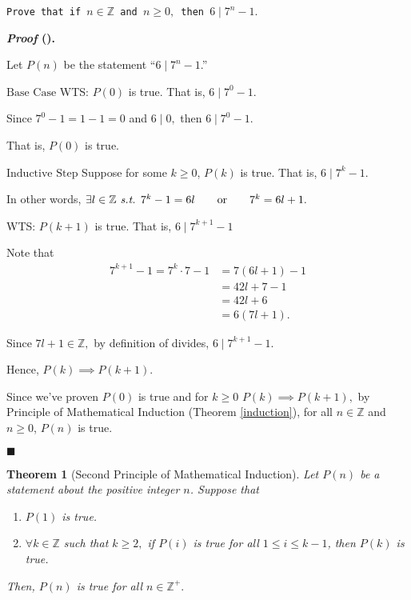\documentclass[12pt,a4paper]{article}
\newtheorem{thm}{Theorem}[subsection]
\newcounter{nprf}[subsection]
\newenvironment*{prf}{\par\indent\textbf{\textit{Proof} (\stepcounter{nprf}\thenprf). }\par}{\par\hfill $\blacksquare$\par}
\def\Z{{\mathbb{Z}}}
\def\Zp{{\Z^{+}}}
\def\st{\emph{ s.t. }}
\begin{document}
\begin{framed}
\noindent\texttt{Prove that if $n\in\Z$ and $n\geq0,$ then $6\mid7^n-1.$}
\begin{prf}
	Let $P(n)$ be the statement ``$6\mid7^n-1$.''\par$\boxed{\text{Base Case}}$ WTS: $P(0)$ is true. That is, $6\mid7^0-1.$\par\hspace{5mm} Since $7^0-1=1-1=0$ and $6\mid0,$ then $6\mid7^0-1.$\par\hspace{5mm} That is, $P(0)$ is true. \par$\boxed{\text{Inductive Step}}$ Suppose for some $k\geq0$, $P(k)$ is true. That is, $6\mid7^k-1. $\par\hspace{5mm} In other words, $\exists l\in\Z\st7^k-1=6l\qquad\text{or}\qquad7^k=6l+1.$\par\hspace{5mm} WTS: $P(k+1)$ is true. That is, $6\mid7^{k+1}-1$\par\hspace{5mm} Note that \[\begin{aligned}7^{k+1}-1=7^k\cdot7-1&=7(6l+1)-1\\&=42l+7-1\\&=42l+6\\&=6(7l+1).\end{aligned}\]\par\hspace{5mm} Since $7l+1\in\Z,$ by definition of divides, $6\mid7^{k+1}-1.$\par\hspace{5mm} Hence, $P(k)\implies P(k+1).$\par Since we've proven $P(0)$ is true and for $k\geq0$ $P(k)\implies P(k+1),$ by Principle of Mathematical Induction (Theorem \ref{induction}), for all $n\in\Z$ and $n\geq0$, $P(n)$ is true. 
\end{prf}
\end{framed}
\begin{thm}[Second Principle of Mathematical Induction]\label{stronginduction}
	Let $P(n)$ be a statement about the positive integer $n$. Suppose that \begin{enumerate}
		\item $P(1)$ is true.
		\item $\forall k\in\Z$ such that $k\geq2,$ if $P(i)$ is true for all $1\leq i\leq k-1$, then $P(k)$ is true.
	\end{enumerate}	
	Then, $P(n)$ is true for all $n\in\Zp.$
\end{thm}
\end{document}
